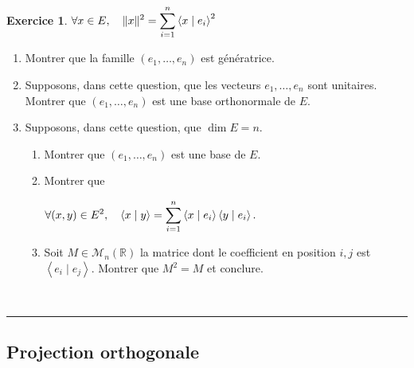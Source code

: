 \documentclass[a4paper,11pt]{article}
\theoremstyle{definition}
\newtheorem{exo}{Exercice} %
\begin{document}
\begin{minipage}{1\linewidth}
\begin{minipage}[t]{0.48\linewidth}
\begin{exo}
			\centering $ \displaystyle \forall x \in E, \quad\|x\|^{2}=\sum_{i=1}^{n}\left\langle x \mid e_{i}\right\rangle^{2} $
			
			\raggedright
			
			\begin{enumerate}
				\item Montrer que la famille $\left(e_{1}, \ldots, e_{n}\right)$ est génératrice.
				\item Supposons, dans cette question, que les vecteurs $e_{1}, \ldots, e_{n}$ sont unitaires. Montrer que $\left(e_{1}, \ldots, e_{n}\right)$ est une base orthonormale de $E$.
				\item Supposons, dans cette question, que $\operatorname{dim} E=n$.
				\begin{enumerate}
					\item Montrer que $\left(e_{1}, \ldots, e_{n}\right)$ est une base de $E$.
					\item Montrer que
					
					$
					\displaystyle \forall(x, y) \in E^{2}, \quad\langle x \mid y\rangle=\sum_{i=1}^{n}\left\langle x \mid e_{i}\right\rangle\left\langle y \mid e_{i}\right\rangle .
					$
					\item Soit $M \in \mathscr{M}_{n}(\mathbb{R})$ la matrice dont le coefficient en position $i, j$ est $\left\langle e_{i} \mid e_{j}\right\rangle$. Montrer que $M^{2}=M$ et conclure.
					
				\end{enumerate} 
				
			\end{enumerate}

		\end{exo}
		

		
		
		
\end{minipage}\end{minipage}\hfil\\[0.5cm]
\rule{1\linewidth}{0.6pt}
\subsection*{Projection orthogonale}
\end{document}
